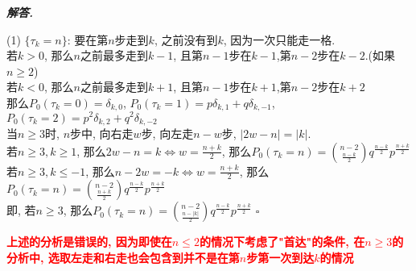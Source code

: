 \documentclass[10pt, a4paper, oneside]{ctexart}
\newenvironment{solution}{%
  \par\noindent\textbf{\textit{解答. }}\ignorespaces
}{%
  \hfill\ensuremath{\square}\par %
}
\begin{document}
\begin{solution}
(1) $\{\tau_{k}=n\}$: 要在第$n$步走到$k$, 之前没有到$k$, 因为一次只能走一格.\\若$k>0$, 那么$n$之前最多走到$k-1$, 且第$n-1$步在$k-1$,第$n-2$步在$k-2$.(如果$n\geq 2$)\\
若$k<0$, 那么$n$之前最多走到$k+1$, 且第$n-1$步在$k+1$,第$n-2$步在$k+2$\\
那么$P_0(\tau_k=0)=\delta_{k,0}$, $P_0(\tau_k=1)=p\delta_{k,1}+q\delta_{k,-1}$, $P_0(\tau_k=2)=p^2\delta_{k,2}+q^2\delta_{k,-2}$\\
当$n\geq 3$时, $n$步中, 向右走$w$步, 向左走$n-w$步, $|2w-n|=|k|$.\\
若$n\geq 3, k\geq 1$, 那么$2w-n=k\iff w=\frac{n+k}{2}$, 那么$P_0(\tau_k=n)= {n-2 \choose \frac{n-k}{2} }q^{\frac{n-k}{2}}p^{\frac{n+k}{2}}$\\
若$n\geq 3, k\leq -1$, 那么$n-2w=-k\iff w=\frac{n+k}{2}$, 那么$P_0(\tau_k=n)={n-2\choose \frac{n+k}{2}}q^{\frac{n-k}{2}}p^{\frac{n+k}{2}}$\\
即, 若$n\geq 3$, 那么$P_0(\tau_k=n)={n-2\choose \frac{n-|k|}{2}}q^{\frac{n-k}{2}}p^{\frac{n+k}{2}}$
\end{solution}
\textcolor{red}{\textbf{上述的分析是错误的, 因为即使在$n\leq 2$的情况下考虑了"首达"的条件, 在$n\geq 3$的分析中, 选取左走和右走也会包含到并不是在第$n$步第一次到达$k$的情况}}
\\
\end{document}
